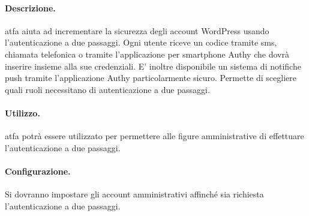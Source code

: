 \paragraph{Descrizione.} \gls{atfa} aiuta ad incrementare la sicurezza degli account WordPress usando l'autenticazione a due passaggi. Ogni utente riceve un codice tramite sms, chiamata telefonica o tramite l'applicazione per smartphone Authy che dovrà inserire insieme alla sue credenziali. E' inoltre disponibile un sistema di notifiche push tramite l'applicazione Authy particolarmente sicuro. Permette di scegliere quali ruoli necessitano di autenticazione a due passaggi.
\paragraph{Utilizzo.} \gls{atfa} potrà essere utilizzato per permettere alle figure amministrative di effettuare l'autenticazione a due passaggi.
\paragraph{Configurazione.} Si dovranno impostare gli account amministrativi affinché sia richiesta l'autenticazione a due passaggi.


